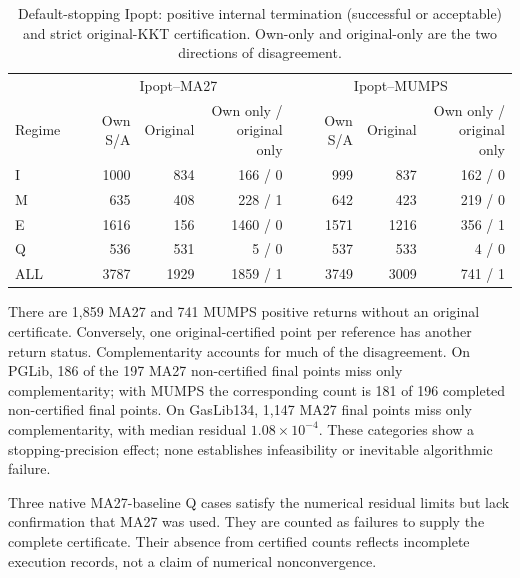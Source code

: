 \documentclass[pdflatex,sn-mathphys-num]{sn-jnl}
\theoremstyle{thmstyleone}
\theoremstyle{thmstylethree}
\newcounter{algorithm}
\begin{document}
\begin{table}[!htbp]
\centering\small
\caption{Default-stopping Ipopt: positive internal termination
(successful or acceptable) and strict original-KKT certification.
Own-only and original-only are the two directions of disagreement.}
\label{tab:internal-original}

\begin{tabular}{lrrrrrr}
\toprule
& \multicolumn{3}{c}{Ipopt--MA27} & \multicolumn{3}{c}{Ipopt--MUMPS} \\
Regime & Own S/A & Original & \shortstack{Own only /\\original only} & Own S/A & Original & \shortstack{Own only /\\original only} \\
\midrule
I & 1000 & 834 & 166 / 0 & 999 & 837 & 162 / 0 \\
M & 635 & 408 & 228 / 1 & 642 & 423 & 219 / 0 \\
E & 1616 & 156 & 1460 / 0 & 1571 & 1216 & 356 / 1 \\
Q & 536 & 531 & 5 / 0 & 537 & 533 & 4 / 0 \\
ALL & 3787 & 1929 & 1859 / 1 & 3749 & 3009 & 741 / 1 \\
\bottomrule
\end{tabular}


\end{table}

There are 1,859 MA27 and 741 MUMPS positive returns without an original
certificate. Conversely, one original-certified point per reference has
another return status. Complementarity accounts for much of the
disagreement. On PGLib, 186 of the 197 MA27 non-certified final points
miss only complementarity; with MUMPS the corresponding count is 181
of 196 completed non-certified final points. On GasLib134, 1,147 MA27
final points miss only complementarity, with median residual
$1.08\times10^{-4}$. These categories show a stopping-precision effect;
none establishes infeasibility or inevitable algorithmic failure.

Three native MA27-baseline Q cases satisfy the numerical residual limits
but lack confirmation that MA27 was used. They are counted as
failures to supply the complete certificate. Their absence from certified
counts reflects incomplete execution records, not a claim of numerical
nonconvergence.
\FloatBarrier
\end{document}
